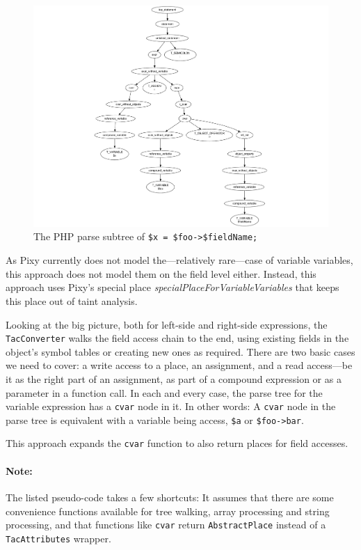 \begin{figure}[htb]
  \begin{center}
    \includegraphics[scale=.9, trim=60mm 0mm 0mm 0mm]{images/variable-field-access-right}
    \caption{The PHP parse subtree of \texttt{\$x = \$foo->\$fieldName;}}
    \label{fig:variable-field-access-right}
  \end{center}
\end{figure}

As Pixy currently does not model the---relatively rare---case of variable variables, this approach does not model them on the field level either. Instead, this approach uses Pixy's special place \emph{specialPlaceForVariableVariables} that keeps this place out of taint analysis.

Looking at the big picture, both for left-side and right-side expressions, the \texttt{TacConverter} walks the field access chain to the end, using existing fields in the object's symbol tables or creating new ones as required. There are two basic cases we need to cover: a write access to a place, \ie an assignment, and a read access---be it as the right part of an assignment, as part of a compound expression or as a parameter in a function call. In each and every case, the parse tree for the variable expression has a \texttt{cvar} node in it. In other words: A \texttt{cvar} node in the parse tree is equivalent with a variable being access, \eg \texttt{\$a} or \texttt{\$foo->bar}.

This approach expands the \texttt{cvar} function to also return places for field accesses.

\paragraph{Note:} The listed pseudo-code takes a few shortcuts: It assumes that there are some convenience functions available for tree walking, array processing and string processing, and that functions like \texttt{cvar} return \texttt{AbstractPlace} instead of a \texttt{TacAttributes} wrapper.

